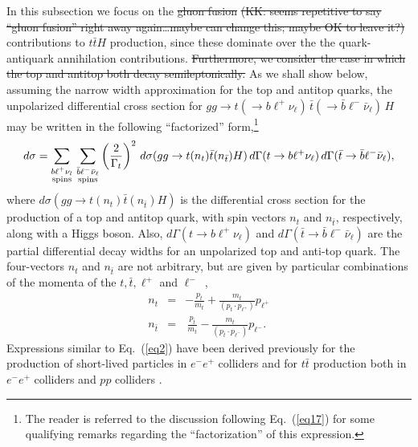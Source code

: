 \documentclass[aps,preprint,tightenlines,floatfix,superscriptaddress,nofootinbib,showpacs]{revtex4-1}
\def\beq{\begin{equation}}
\def\eeq{\end{equation}}
\def\bea{\begin{eqnarray}}
\def\eea{\end{eqnarray}}
\def\tbar{\bar{t}}
\def\bbar{\bar{b}}
\def\nubar{{\bar{\nu}}_{\ell}}
\providecommand{\DIFadd}[1]{{\protect\color{blue}\uwave{#1}}} %
\providecommand{\DIFdel}[1]{{\protect\color{red}\sout{#1}}}                      %
\providecommand{\DIFaddbegin}{} %
\providecommand{\DIFaddend}{} %
\providecommand{\DIFdelbegin}{} %
\providecommand{\DIFdelend}{} %
\begin{document}
In this subsection we focus on the \DIFdelbegin \DIFdel{gluon fusion
}%
\DIFdel{(KK: seems repetitive to say ``gluon fusion'' right away
  again\ldots maybe can change this; maybe OK to leave it?)}%
\DIFdelend \DIFaddbegin \DIFadd{$gg$-initiated
}\DIFaddend contributions
to $t\tbar H$ production, since these dominate over the
the quark-antiquark annihilation contributions. \DIFdelbegin \DIFdel{Furthermore,
we consider the case in which the top and antitop both decay
semileptonically.  }\DIFdelend As we shall show below, assuming the
narrow width approximation for the top and antitop quarks, the unpolarized
differential cross section for $gg\to t(\to
b{\ell}^+\nu_{\ell})\,\tbar(\to \bbar {\ell}^- \nubar)\,H$ may be
written in the following ``factorized'' form,\footnote{The reader
  is referred to the discussion following Eq.~(\ref{eq17}) for some qualifying
  remarks regarding the ``factorization'' of this expression.}
%
\beq
\label{eq2}
d\sigma =\sum_{\substack{b{\ell}^+\nu_l \\ \tiny{\mathrm{spins}}}}\,
   \sum_{\substack{\bbar {\ell}^-\nubar \\ \mathrm{\tiny{spins}}}}\left(\frac{2}{\Gamma_t}\right)^2\,
   d\sigma(gg\to t(n_t)\tbar (n_{\tbar})H)\,
   d\Gamma(t\to b{\ell}^+\nu_{\ell})\,
   d\Gamma(\tbar \to \bbar {\ell}^-\nubar),
\eeq  
%
where $d\sigma(gg\to t(n_t)\tbar (n_{\tbar})H)$ is the differential
cross section for the production of a top and antitop quark,
with spin vectors $n_t$ and $n_{\bar{t}}$, respectively, along with a Higgs
boson.  Also, $d\Gamma(t\to b{\ell}^+\nu_{\ell})$ and
$d\Gamma(\tbar \to \bbar {\ell}^-\nubar)$ are the
partial differential decay widths for an unpolarized top and
anti-top quark.  The four-vectors
$n_t$ and $n_{\tbar}$ are not arbitrary, but are
given by particular combinations of the
momenta of the $t,\tbar, \ell^+$ and $\ell^-$~\cite{Arens},
%
\bea
\label{eq3}
n_t&=&-\frac{p_t}{m_t}+\frac{m_t}{(p_t\cdot p_{{\ell}^+})}p_{{\ell}^+}\\
\label{eq4}
n_{\tbar}&=&\,\frac{p_{\tbar}}{m_t}-\frac{m_t}{(p_{\tbar}\cdot p_{{\ell}^-})}p_{{\ell}^-}.
\eea
%
Expressions similar to Eq.~(\ref{eq2}) have been derived previously for the
production of short-lived particles in $e^-e^+$ colliders
\cite{kawasaki} and for $t\tbar$ production both in
$e^-e^+$ colliders \cite{Arens} and $pp$ colliders
\cite{ale1,*ale2,*ale3,*ale4}. \par
\end{document}
